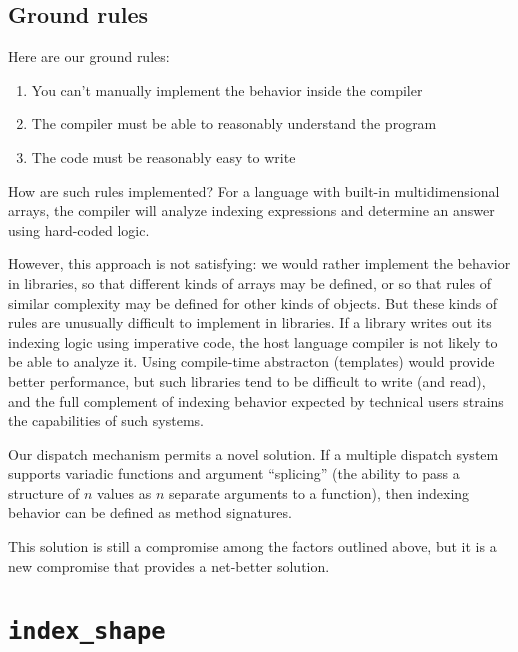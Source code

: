 \documentclass[preprint]{sigplanconf}
\begin{document}

\subsection{Ground rules}
Here are our ground rules:

\begin{enumerate}
\item You can't manually implement the behavior inside the compiler
\item The compiler must be able to reasonably understand the program
\item The code must be reasonably easy to write
\end{enumerate}


How are such rules implemented? For a
language with built-in multidimensional arrays, the compiler will
analyze indexing expressions and determine an answer using hard-coded
logic.

However, this approach is not satisfying: we would rather
implement the behavior in libraries, so that different kinds of arrays
may be defined, or so that rules of similar complexity may be
defined for other kinds of objects. But these kinds of rules are
unusually difficult to implement in libraries. If a library writes out
its indexing logic using imperative code, the host language compiler
is not likely to be able to analyze it. Using compile-time abstracton
(templates) would provide better performance, but such libraries tend
to be difficult to write (and read), and the full complement of
indexing behavior expected by technical users strains the capabilities
of such systems.


Our dispatch mechanism permits a novel solution. If a multiple dispatch
system supports variadic functions and argument ``splicing'' (the ability
to pass a structure of $n$ values as $n$ separate arguments to a function),
then indexing behavior can be defined as method signatures.

This solution is still a compromise among the factors outlined above,
but it is a new compromise that provides a net-better solution.

\section{\texttt{index\_shape}}
\end{document}
